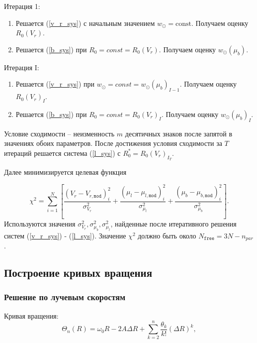\documentclass{matmex-diploma-custom}
\begin{document}
Итерация 1:
\begin{enumerate}
        \item Решается (\ref{v_r_sys}) с начальным значением $w_{\odot} = \textrm{const}$. Получаем оценку $R_0(V_r)$.

        \item Решается (\ref{b_sys}) при $R_0 = const = R_0(V_r)$. Получаем оценку $w_{\odot}(\mu_b)$.
\end{enumerate}
\par Итерация I:
\begin{enumerate}
        \item Решается (\ref{v_r_sys}) при $w_{\odot} = const = w_{\odot}(\mu_b)_{I - 1}$. Получаем оценку $R_0(V_r)_I$.
        \item Решается (\ref{b_sys}) при $R_0 = const = R_0(V_r)_I$. Получаем оценку $w_{\odot}(\mu_b)_I$.
\end{enumerate}
Условие сходимости -- неизменность $m$ десятичных знаков после запятой в значениях обоих параметров. После достижения условия сходимости за $T$ итераций решается система (\ref{l_sys}) с $R_0^{*}=R_0(V_r)_{I_T}$.

Далее минимизируется целевая функция

\begin{equation} \label{chi_sq_func}
                \chi^2 = \sum^N_{i = 1} \left[ \frac{\left( V_r - V_{r, \texttt{mod}} \right)^2_i}{\sigma^2_{V_r}} + \frac{\left( \mu_l - \mu_{l, \texttt{mod}} \right)^2_i}{\sigma^2_{\mu_l}} + \frac{\left( \mu_b - \mu_{b, \texttt{mod}} \right)^2_i}{\sigma^2_{\mu_b}} \right].
	\end{equation}
Используются значения $\sigma^2_{V_r}, \sigma^2_{\mu_b}, \sigma^2_{\mu_l}$, найденные после итеративного решения систем (\ref{v_r_sys}) - (\ref{l_sys}). Значение $\chi^2$ должно быть около $N_{\texttt{free}} = 3 N - n_{par}$. 

\pagebreak
\subsection{Построение кривых вращения}
\subsubsection{Решение по лучевым скоростям}
Кривая вращения:
\begin{equation}
        \Theta_n(R) = \omega_0 R - 2A\Delta R + \sum^n_{k = 2} \frac{\theta_k}{k!} \left( \Delta R \right)^k ,
\end{equation}
\end{document}
